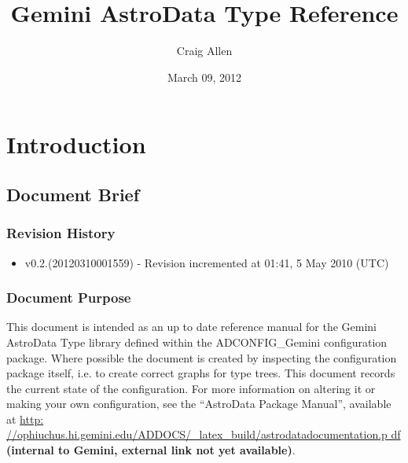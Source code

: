 \documentclass[letterpaper,10pt,english]{sphinxmanual}
\title{Gemini AstroData Type Reference}
\date{March 09, 2012}
\author{Craig Allen}
\begin{document}
\maketitle
\setcounter{tocdepth}{6}
\tableofcontents
{}\label{chapter_Gemini_Types::doc}



\chapter{Introduction}
\label{gatref/GATREF-introduction:introduction}\label{gatref/GATREF-introduction:gemini-astrodata-types-reference}\label{gatref/GATREF-introduction::doc}

\section{Document Brief}
\label{gatref/gatrefdocbrief:document-brief}\label{gatref/gatrefdocbrief::doc}

\subsection{Revision History}
\label{gatref/gen.GATREF-RevisionHistory:revision-history}\label{gatref/gen.GATREF-RevisionHistory::doc}\begin{itemize}
\item {} 
v0.2.(20120310001559) - Revision incremented at 01:41, 5 May 2010
(UTC)

\end{itemize}


\subsection{Document Purpose}
\label{gatref/gen.GATREF-Purpose::doc}\label{gatref/gen.GATREF-Purpose:document-purpose}
This document is intended as an up to date reference manual for the
Gemini AstroData Type library defined within the ADCONFIG\_Gemini
configuration package. Where possible the document is created by
inspecting the configuration package itself, i.e. to create correct
graphs for type trees. This document records the current state of the
configuration. For more information on altering it or making your own
configuration, see the ``AstroData Package Manual'', available at \href{http://ophiuchus.hi.gemini.edu/ADDOCS/\_latex\_build/astrodatadocumentation.pdf}{http:
//ophiuchus.hi.gemini.edu/ADDOCS/\_latex\_build/astrodatadocumentation.p
df} \textbf{(internal to Gemini, external link not yet
available)}.
\end{document}
